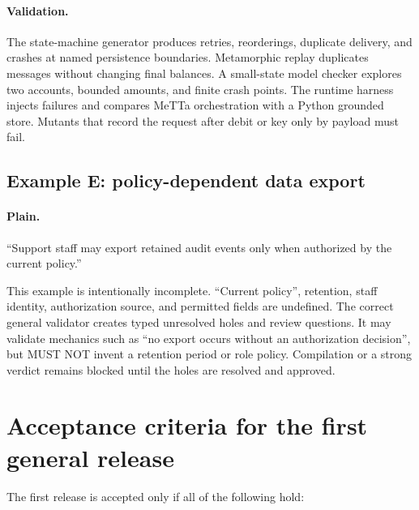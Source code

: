 \documentclass[10pt]{article}
\begin{document}
\paragraph{Validation.}
The state-machine generator produces retries, reorderings, duplicate delivery,
and crashes at named persistence boundaries.  Metamorphic replay duplicates
messages without changing final balances.  A small-state model checker explores
two accounts, bounded amounts, and finite crash points.  The runtime harness
injects failures and compares MeTTa orchestration with a Python grounded store.
Mutants that record the request after debit or key only by payload must fail.

\subsection{Example E: policy-dependent data export}

\paragraph{Plain.}
``Support staff may export retained audit events only when authorized by the
current policy.''

This example is intentionally incomplete.  ``Current policy'', retention,
staff identity, authorization source, and permitted fields are undefined.  The
correct general validator creates typed unresolved holes and review questions.
It may validate mechanics such as ``no export occurs without an authorization
decision'', but MUST NOT invent a retention period or role policy.  Compilation
or a strong verdict remains blocked until the holes are resolved and approved.

\section{Acceptance criteria for the first general release}

The first release is accepted only if all of the following hold:
\end{document}
